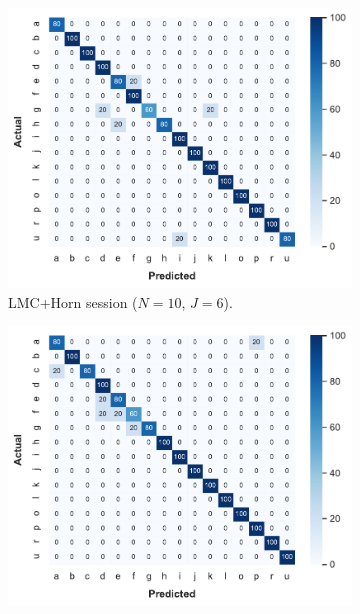 \begin{figure}[t]
    \begin{subfigure}{.49\textwidth}
        \centering
        \includegraphics[width=.99\linewidth]{Figures/RadarExperiments/Datasets/SensorsComparison/LMC/LMC+Horn-confusion-6.pdf}  
        \vspace{-16pt}
        \captionsetup{width=.99\linewidth}
        \caption{LMC+Horn session ($N{=}10$, $J{=}6$).}
        \label{fig:radar-experiments:sensors:lmc-confusion:horn}
    \end{subfigure}
    \begin{subfigure}{.49\textwidth}
        \centering
        \includegraphics[width=.99\linewidth]{Figures/RadarExperiments/Datasets/SensorsComparison/LMC/LMC+Walabot-confusion-11.pdf}

\end{subfigure}
\end{figure}
